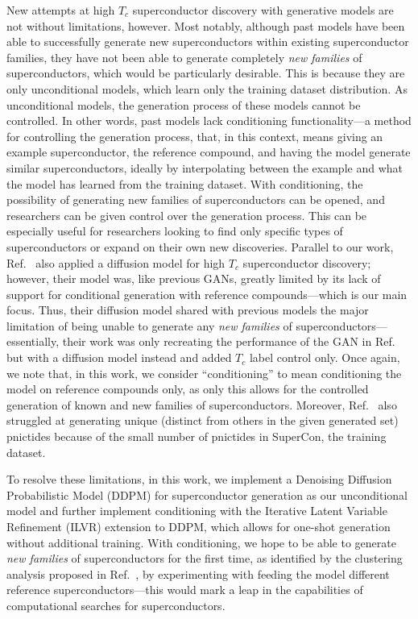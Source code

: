 \documentclass[%
reprint,
 amsmath,amssymb,
 aps,
prb,
]{revtex4-2}
\begin{document}
New attempts at high $T_c$ superconductor discovery with generative models are not without limitations, however. Most notably, although past models have been able to successfully generate new superconductors within existing superconductor families, they have not been able to generate completely {\it new families} of superconductors, which would be particularly desirable. This is because they are only unconditional models, which learn only the training dataset distribution. As unconditional models, the generation process of these models cannot be controlled. In other words, past models lack conditioning functionality---a method for controlling the generation process, that, in this context, means giving an example superconductor, the reference compound, and having the model generate similar superconductors, ideally by interpolating between the example and what the model has learned from the training dataset. With conditioning, the possibility of generating new families of superconductors can be opened, and researchers can be given control over the generation process. This can be especially useful for researchers looking to find only specific types of superconductors or expand on their own new discoveries. Parallel to our work, Ref.~\cite{zhongdiffsupercon} also applied a diffusion model for high $T_c$ superconductor discovery; however, their model was, like previous GANs, greatly limited by its lack of support for conditional generation with reference compounds---which is our main focus. Thus, their diffusion model shared with previous models the major limitation of being unable to generate any {\it new families} of superconductors---essentially, their work was only recreating the performance of the GAN in Ref.~\cite{Kim_2024} but with a diffusion model instead and added $T_c$ label control only. Once again, we note that, in this work, we consider ``conditioning'' to mean conditioning the model on reference compounds only, as only this allows for the controlled generation of known and new families of superconductors. Moreover, Ref.~\cite{Kim_2024} also struggled at generating unique (distinct from others in the given generated set) pnictides because of the small number of pnictides in SuperCon, the training dataset.

To resolve these limitations, in this work, we implement a Denoising Diffusion Probabilistic Model (DDPM) \cite{ho2020denoising, pmlr-v37-sohl-dickstein15} for superconductor generation as our unconditional model and further implement conditioning with the Iterative Latent Variable Refinement (ILVR) \cite{choi2021ilvr} extension to DDPM, which allows for one-shot generation without additional training. With conditioning, we hope to be able to generate {\it new families} of superconductors for the first time, as identified by the clustering analysis proposed in Ref.~\cite{ROTER20221354078}, by experimenting with feeding the model different reference superconductors---this would mark a leap in the capabilities of computational searches for superconductors.
\end{document}
